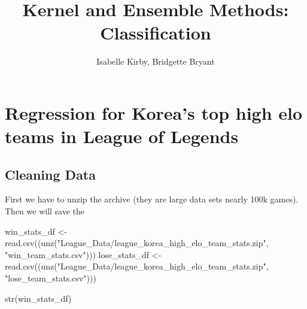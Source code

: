 \documentclass[
]{article}
\title{Kernel and Ensemble Methods: Classification}
\author{Isabelle Kirby, Bridgette Bryant}
\date{}
\newenvironment{Shaded}{\begin{snugshade}}{\end{snugshade}}
\newcommand{\FunctionTok}[1]{\textcolor[rgb]{0.00,0.00,0.00}{#1}}
\newcommand{\NormalTok}[1]{#1}
\newcommand{\OtherTok}[1]{\textcolor[rgb]{0.56,0.35,0.01}{#1}}
\newcommand{\StringTok}[1]{\textcolor[rgb]{0.31,0.60,0.02}{#1}}
\begin{document}
\maketitle

\hypertarget{regression-for-koreas-top-high-elo-teams-in-league-of-legends}{%
\section{Regression for Korea's top high elo teams in League of
Legends}\label{regression-for-koreas-top-high-elo-teams-in-league-of-legends}}

\hypertarget{cleaning-data}{%
\subsection{Cleaning Data}\label{cleaning-data}}

First we have to unzip the archive (they are large data sets nearly 100k
games). Then we will save the

\begin{Shaded}
\begin{Highlighting}[]
\NormalTok{win\_stats\_df }\OtherTok{\textless{}{-}} \FunctionTok{read.csv}\NormalTok{((}\FunctionTok{unz}\NormalTok{(}\StringTok{"League\_Data/league\_korea\_high\_elo\_team\_stats.zip"}\NormalTok{, }\StringTok{"win\_team\_stats.csv"}\NormalTok{)))}
\NormalTok{lose\_stats\_df }\OtherTok{\textless{}{-}} \FunctionTok{read.csv}\NormalTok{((}\FunctionTok{unz}\NormalTok{(}\StringTok{"League\_Data/league\_korea\_high\_elo\_team\_stats.zip"}\NormalTok{, }\StringTok{"lose\_team\_stats.csv"}\NormalTok{)))}

\FunctionTok{str}\NormalTok{(win\_stats\_df)}
\end{Highlighting}
\end{Shaded}
\end{document}
